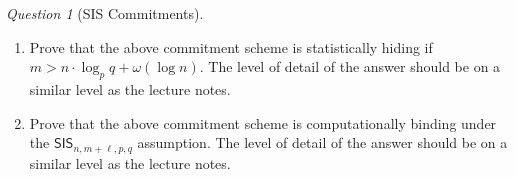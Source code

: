 \documentclass[10pt,twoside]{article}
\newif\ifsolution
\newcommand{\inputsol}[1]{\ifsolution\begin{tcolorbox}[breakable]\end{tcolorbox}\fi}
\theoremstyle{remark}
\newtheorem{question}{Question}
\newcommand{\SIS}{\mathsf{SIS}}
\begin{document}
\begin{question}[SIS Commitments]
\begin{pchstack}
    \end{pchstack}
    \begin{enumerate}[label=(\alph*)]
        \item Prove that the above commitment scheme is statistically hiding if $m > n \cdot \log_p q + \omega(\log n)$. The level of detail of the answer should be on a similar level as the lecture notes.
        \item Prove that the above commitment scheme is computationally binding under the $\SIS_{n,m+\ell,p,q}$ assumption. The level of detail of the answer should be on a similar level as the lecture notes.
    \end{enumerate}
\end{question}

\inputsol{sis_com}
\end{document}
